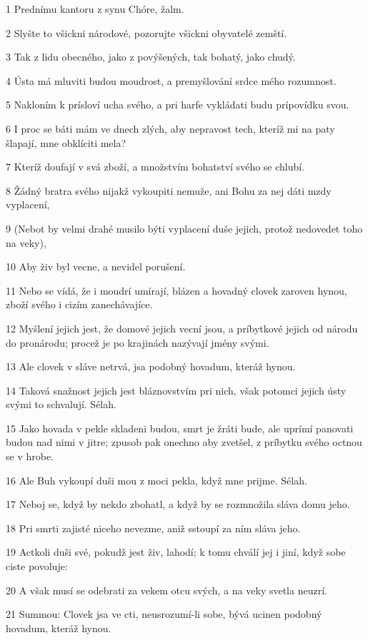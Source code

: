 \par 1 Prednímu kantoru z synu Chóre, žalm.
\par 2 Slyšte to všickni národové, pozorujte všickni obyvatelé zemští.
\par 3 Tak z lidu obecného, jako z povýšených, tak bohatý, jako chudý.
\par 4 Ústa má mluviti budou moudrost, a premyšlování srdce mého rozumnost.
\par 5 Nakloním k prísloví ucha svého, a pri harfe vykládati budu prípovídku svou.
\par 6 I proc se báti mám ve dnech zlých, aby nepravost tech, kteríž mi na paty šlapají, mne obklíciti mela?
\par 7 Kteríž doufají v svá zboží, a množstvím bohatství svého se chlubí.
\par 8 Žádný bratra svého nijakž vykoupiti nemuže, ani Bohu za nej dáti mzdy vyplacení,
\par 9 (Nebot by velmi drahé musilo býti vyplacení duše jejich, protož nedovedet toho na veky),
\par 10 Aby živ byl vecne, a nevidel porušení.
\par 11 Nebo se vídá, že i moudrí umírají, blázen a hovadný clovek zaroven hynou, zboží svého i cizím zanechávajíce.
\par 12 Myšlení jejich jest, že domové jejich vecní jsou, a príbytkové jejich od národu do pronárodu; procež je po krajinách nazývají jmény svými.
\par 13 Ale clovek v sláve netrvá, jsa podobný hovadum, kteráž hynou.
\par 14 Taková snažnost jejich jest bláznovstvím pri nich, však potomci jejich ústy svými to schvalují. Sélah.
\par 15 Jako hovada v pekle skladeni budou, smrt je žráti bude, ale uprímí panovati budou nad nimi v jitre; zpusob pak onechno aby zvetšel, z príbytku svého octnou se v hrobe.
\par 16 Ale Buh vykoupí duši mou z moci pekla, když mne prijme. Sélah.
\par 17 Neboj se, když by nekdo zbohatl, a když by se rozmnožila sláva domu jeho.
\par 18 Pri smrti zajisté niceho nevezme, aniž sstoupí za ním sláva jeho.
\par 19 Actkoli duši své, pokudž jest živ, lahodí; k tomu chválí jej i jiní, když sobe ciste povoluje:
\par 20 A však musí se odebrati za vekem otcu svých, a na veky svetla neuzrí.
\par 21 Summou: Clovek jsa ve cti, neusrozumí-li sobe, bývá ucinen podobný hovadum, kteráž hynou.

